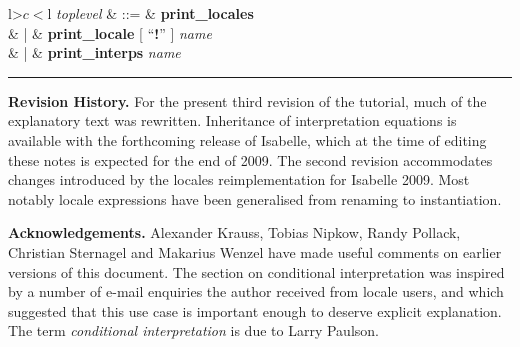 \begin{isabellebody}
\begin{isamarkuptext}
\begin{table}
\begin{center}
\begin{tabular}{l>$c<$l}
  \textit{toplevel} & ::=
  & \textbf{print\_locales} \\
  & | & \textbf{print\_locale} [ ``\textbf{!}'' ] \textit{name} \\
  & | & \textbf{print\_interps} \textit{name}
\end{tabular}
\end{center}
\hrule
\caption{Syntax of Locale Commands.}
\label{tab:commands}
\end{table}%
\end{isamarkuptext}%
\isamarkuptrue%
%
\begin{isamarkuptext}%
\textbf{Revision History.}  For the present third revision of
  the tutorial, much of the explanatory text
  was rewritten.  Inheritance of interpretation equations is
  available with the forthcoming release of Isabelle, which at the
  time of editing these notes is expected for the end of 2009.
  The second revision accommodates changes introduced by the locales
  reimplementation for Isabelle 2009.  Most notably locale expressions
  have been generalised from renaming to instantiation.%
\end{isamarkuptext}%
\isamarkuptrue%
%
\begin{isamarkuptext}%
\textbf{Acknowledgements.}  Alexander Krauss, Tobias Nipkow,
  Randy Pollack, Christian Sternagel and Makarius Wenzel have made
  useful comments on earlier versions of this document.  The section
  on conditional interpretation was inspired by a number of e-mail
  enquiries the author received from locale users, and which suggested
  that this use case is important enough to deserve explicit
  explanation.  The term \emph{conditional interpretation} is due to
  Larry Paulson.%
\end{isamarkuptext}%
\isamarkuptrue%
%
\isadelimtheory
%
\endisadelimtheory
%
\isatagtheory
{}\isamarkupfalse%
%
\endisatagtheory
{\isafoldtheory}%
%
\isadelimtheory
%
\endisadelimtheory
\isanewline
\end{isabellebody}%
